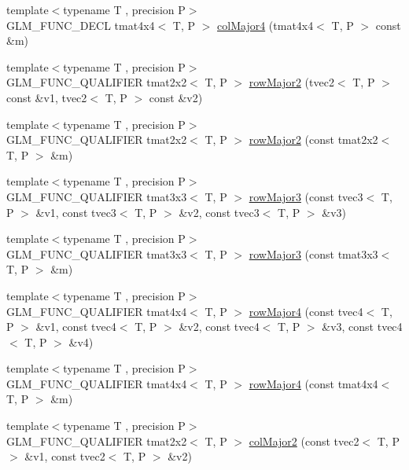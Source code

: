 \begin{DoxyCompactItemize}
\item 
{\footnotesize template$<$typename T , precision P$>$ }\\G\+L\+M\+\_\+\+F\+U\+N\+C\+\_\+\+D\+E\+C\+L tmat4x4$<$ T, P $>$ \hyperlink{group__gtx__matrix__major__storage_ga7592acfd27da055e2d7c39564cf8803d}{col\+Major4} (tmat4x4$<$ T, P $>$ const \&m)
\item 
{\footnotesize template$<$typename T , precision P$>$ }\\G\+L\+M\+\_\+\+F\+U\+N\+C\+\_\+\+Q\+U\+A\+L\+I\+F\+I\+E\+R tmat2x2$<$ T, P $>$ \hyperlink{group__gtx__matrix__major__storage_ga0c7f4d56a85865f0002127119ab7d551}{row\+Major2} (tvec2$<$ T, P $>$ const \&v1, tvec2$<$ T, P $>$ const \&v2)
\item 
{\footnotesize template$<$typename T , precision P$>$ }\\G\+L\+M\+\_\+\+F\+U\+N\+C\+\_\+\+Q\+U\+A\+L\+I\+F\+I\+E\+R tmat2x2$<$ T, P $>$ \hyperlink{namespaceglm_a1f0fe9110e79b5cce1d9b90a37aeb588}{row\+Major2} (const tmat2x2$<$ T, P $>$ \&m)
\item 
{\footnotesize template$<$typename T , precision P$>$ }\\G\+L\+M\+\_\+\+F\+U\+N\+C\+\_\+\+Q\+U\+A\+L\+I\+F\+I\+E\+R tmat3x3$<$ T, P $>$ \hyperlink{namespaceglm_a782684c2273dd5745cfeb6fb34c1164c}{row\+Major3} (const tvec3$<$ T, P $>$ \&v1, const tvec3$<$ T, P $>$ \&v2, const tvec3$<$ T, P $>$ \&v3)
\item 
{\footnotesize template$<$typename T , precision P$>$ }\\G\+L\+M\+\_\+\+F\+U\+N\+C\+\_\+\+Q\+U\+A\+L\+I\+F\+I\+E\+R tmat3x3$<$ T, P $>$ \hyperlink{namespaceglm_a5e0ea3822d5b2947a3e9b50d912f25ad}{row\+Major3} (const tmat3x3$<$ T, P $>$ \&m)
\item 
{\footnotesize template$<$typename T , precision P$>$ }\\G\+L\+M\+\_\+\+F\+U\+N\+C\+\_\+\+Q\+U\+A\+L\+I\+F\+I\+E\+R tmat4x4$<$ T, P $>$ \hyperlink{namespaceglm_af2dd40e8dcdf8b7a0a80a941e3e1811c}{row\+Major4} (const tvec4$<$ T, P $>$ \&v1, const tvec4$<$ T, P $>$ \&v2, const tvec4$<$ T, P $>$ \&v3, const tvec4$<$ T, P $>$ \&v4)
\item 
{\footnotesize template$<$typename T , precision P$>$ }\\G\+L\+M\+\_\+\+F\+U\+N\+C\+\_\+\+Q\+U\+A\+L\+I\+F\+I\+E\+R tmat4x4$<$ T, P $>$ \hyperlink{namespaceglm_adc5ece283b1d71979ae91132f28ffb83}{row\+Major4} (const tmat4x4$<$ T, P $>$ \&m)
\item 
{\footnotesize template$<$typename T , precision P$>$ }\\G\+L\+M\+\_\+\+F\+U\+N\+C\+\_\+\+Q\+U\+A\+L\+I\+F\+I\+E\+R tmat2x2$<$ T, P $>$ \hyperlink{namespaceglm_aae808fcd7cca78d060bdbe4bf188bc06}{col\+Major2} (const tvec2$<$ T, P $>$ \&v1, const tvec2$<$ T, P $>$ \&v2)

\end{DoxyCompactItemize}
